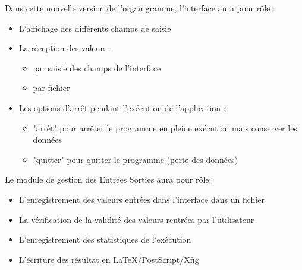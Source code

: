 \documentclass[a4paper,11pt]{article}
\begin{document}
		\noindent Dans cette nouvelle version de l’organigramme, l’interface aura pour rôle :
		\begin{itemize}
		\item L’affichage des différents champs de saisie
		\item La réception des valeurs :
			\begin{itemize}
				\item par saisie des champs de l’interface
				\item par fichier
			\end{itemize}
		\item Les options d’arrêt pendant l'exécution de l’application :
			\begin{itemize}
				\item "arrêt" pour arrêter le programme en pleine exécution mais conserver les données
				\item "quitter" pour quitter le programme (perte des données)\\
			\end{itemize}
		\end{itemize}
		Le module de gestion des Entrées Sorties aura pour rôle:
		\begin{itemize}
			\item L’enregistrement des valeurs entrées dans l’interface dans un fichier
			\item La vérification de la validité des valeurs rentrées par l’utilisateur
			\item L’enregistrement des statistiques de l'exécution
			\item L'écriture des résultat en LaTeX/PostScript/Xfig\\
		\end{itemize}
\end{document}
